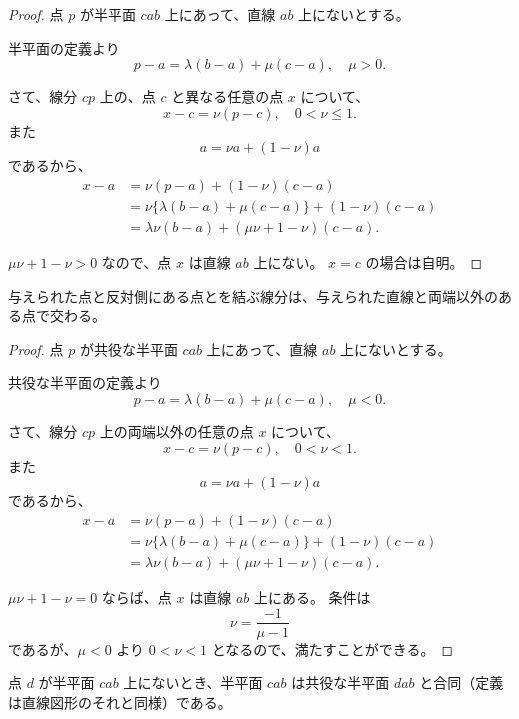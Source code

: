 \begin{proof}
  点 \(p\) が半平面 \(cab\) 上にあって、直線 \(ab\) 上にないとする。

  半平面の定義より
  \[p-a=\lambda(b-a)+\mu(c-a),\quad \mu>0.\]

  さて、線分 \(cp\) 上の、点 \(c\) と異なる任意の点 \(x\) について、
  \[x-c=\nu(p-c),\quad 0<\nu\leq 1.\]
  また
  \[a=\nu a+(1-\nu)a\]
  であるから、
  \begin{align*}
    x-a &=\nu(p-a)+(1-\nu)(c-a) \\
        &=\nu\{\lambda(b-a)+\mu(c-a)\}+(1-\nu)(c-a) \\
        &=\lambda\nu(b-a)+(\mu\nu+1-\nu)(c-a).
  \end{align*}

  \(\mu\nu+1-\nu>0\) なので、点 \(x\) は直線 \(ab\) 上にない。
  \(x=c\) の場合は自明。
\end{proof}


\begin{thm}\label{260424012501}
  与えられた点と反対側にある点とを結ぶ線分は、与えられた直線と両端以外のある点で交わる。
\end{thm}

\begin{proof}
  点 \(p\) が共役な半平面 \(cab\) 上にあって、直線 \(ab\) 上にないとする。

  共役な半平面の定義より
  \[p-a=\lambda(b-a)+\mu(c-a),\quad \mu<0.\]

  さて、線分 \(cp\) 上の両端以外の任意の点 \(x\) について、
  \[x-c=\nu(p-c),\quad 0<\nu<1.\]
  また
  \[a=\nu a+(1-\nu)a\]
  であるから、
  \begin{align*}
    x-a &=\nu(p-a)+(1-\nu)(c-a) \\
        &=\nu\{\lambda(b-a)+\mu(c-a)\}+(1-\nu)(c-a) \\
        &=\lambda\nu(b-a)+(\mu\nu+1-\nu)(c-a).
  \end{align*}

  \(\mu\nu+1-\nu=0\) ならば、点 \(x\) は直線 \(ab\) 上にある。
  条件は
  \[\nu=\frac{-1}{\mu-1}\]
  であるが、\(\mu<0\) より \(0<\nu<1\) となるので、満たすことができる。
\end{proof}


\begin{lmm}\label{260502235101}
  点 \(d\) が半平面 \(cab\) 上にないとき、半平面 \(cab\) は共役な半平面 \(dab\) と合同（定義は直線図形のそれと同様）である。
\end{lmm}

